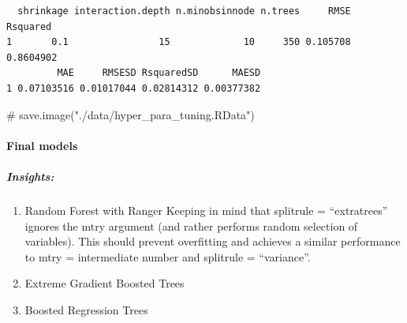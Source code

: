 \documentclass[
  letterpaper,
  DIV=11,
  numbers=noendperiod]{scrartcl}
\let\oldparagraph\paragraph
\renewcommand{\paragraph}[1]{\oldparagraph{#1}\mbox{}}
\let\oldsubparagraph\subparagraph
\renewcommand{\subparagraph}[1]{\oldsubparagraph{#1}\mbox{}}
\newenvironment{Shaded}{\begin{snugshade}}{\end{snugshade}}
\newcommand{\CommentTok}[1]{\textcolor[rgb]{0.37,0.37,0.37}{#1}}
\newcommand{\FunctionTok}[1]{\textcolor[rgb]{0.28,0.35,0.67}{#1}}
\newcommand{\NormalTok}[1]{\textcolor[rgb]{0.00,0.23,0.31}{#1}}
\newcommand{\SpecialCharTok}[1]{\textcolor[rgb]{0.37,0.37,0.37}{#1}}
\begin{document}
\begin{Shaded}
\end{Shaded}

\begin{verbatim}
  shrinkage interaction.depth n.minobsinnode n.trees     RMSE  Rsquared
1       0.1                15             10     350 0.105708 0.8604902
         MAE     RMSESD RsquaredSD      MAESD
1 0.07103516 0.01017044 0.02814312 0.00377382
\end{verbatim}

\begin{Shaded}
\begin{Highlighting}[]
\CommentTok{\# save.image("./data/hyper\_para\_tuning.RData")}
\end{Highlighting}
\end{Shaded}

\paragraph{Final models}\label{final-models}

\subparagraph{Insights:}\label{insights}

\begin{enumerate}
\def\labelenumi{\arabic{enumi}.}
\item
  Random Forest with Ranger Keeping in mind that splitrule =
  ``extratrees'' ignores the mtry argument (and rather performs random
  selection of variables). This should prevent overfitting and achieves
  a similar performance to mtry = intermediate number and splitrule =
  ``variance''.
\item
  Extreme Gradient Boosted Trees
\item
  Boosted Regression Trees
\end{enumerate}
\end{document}
